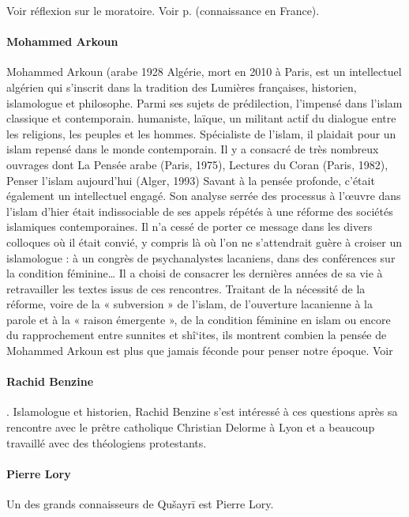 Voir réflexion sur le moratoire.
Voir p. \pageref{Theol:TRamadan1} (connaissance en France).

\paragraph{Mohammed Arkoun}
 Mohammed Arkoun (arabe   1928 Algérie, mort en 2010 à
Paris, est un intellectuel algérien qui s'inscrit dans la tradition des
Lumières françaises, historien, islamologue et philosophe. Parmi ses
sujets de prédilection, l'impensé dans l'islam classique et
contemporain. humaniste, laïque, un militant actif du dialogue entre
les religions, les peuples et les hommes. Spécialiste de l'islam, il
plaidait pour un islam repensé dans le monde contemporain. Il y a
consacré de très nombreux ouvrages dont La Pensée arabe (Paris, 1975),
Lectures du Coran (Paris, 1982), Penser l'islam aujourd'hui (Alger, 1993)
Savant à la pensée profonde, c'était également un intellectuel engagé. Son analyse serrée des processus à l’œuvre dans l’islam d’hier était indissociable de ses appels répétés à une réforme des sociétés islamiques contemporaines. Il n’a cessé de porter ce message dans les divers colloques où il était convié, y compris là où l’on ne s’attendrait guère à croiser un islamologue : à un congrès de psychanalystes lacaniens, dans des conférences sur la condition féminine…
Il a choisi de consacrer les dernières années de sa vie à retravailler les textes issus de ces rencontres. Traitant de la nécessité de la réforme, voire de la « subversion » de l’islam, de l’ouverture lacanienne à la parole et à la « raison émergente », de la condition féminine en islam ou encore du rapprochement entre sunnites et shî‘ites, ils montrent combien la pensée de Mohammed Arkoun est plus que jamais féconde pour penser notre époque.
Voir   
\label{theol:Arkoun3}
\paragraph{Rachid Benzine}.
Islamologue et historien, Rachid Benzine s’est intéressé à ces questions après sa rencontre avec le prêtre catholique Christian Delorme à Lyon et a beaucoup travaillé avec des théologiens protestants.
\paragraph{Pierre Lory}
\label{Theol:PierreLory}
Un des grands connaisseurs de Qušayrī est
Pierre Lory.

